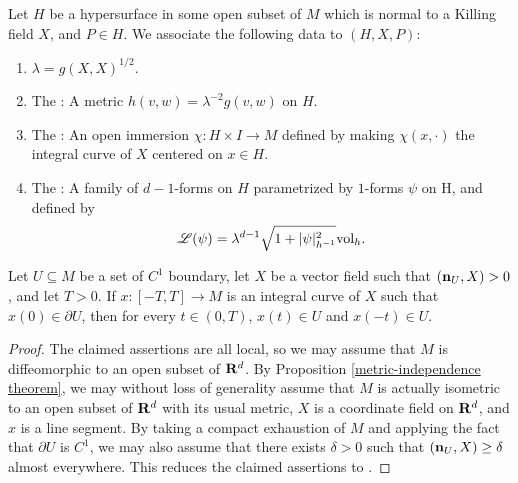 \begin{definition}\label{Killing setup}
Let $H$ be a hypersurface in some open subset of $M$ which is normal to a Killing field $X$, and $P \in H$.
We associate the following data to $(H, X, P)$:
\begin{enumerate}
\item $\lambda = g(X, X)^{1/2}$.
\item The : A metric $h(v, w) = \lambda^{-2} g(v, w)$ on $H$.
\item The : An open immersion $\chi: H \times I \to M$ defined by making $\chi(x, \cdot)$ the integral curve of $X$ centered on $x \in H$.
\item The : A family of $d-1$-forms on $H$ parametrized by $1$-forms $\psi$ on H, and defined by
\begin{equation}\label{area Lagrangian}
\mathscr L(\psi) = \lambda^{d - 1} \sqrt{1 + |\psi|_{h^{-1}}^2} \mathrm{vol}_h.
\end{equation}
\end{enumerate}
\end{definition}

\begin{lemma}\label{Giusti46}
Let $U \subseteq M$ be a set of $C^1$ boundary, let $X$ be a vector field such that $(\mathbf n_U, X) > 0$, and let $T > 0$.
If $x: [-T, T] \to M$ is an integral curve of $X$ such that $x(0) \in \partial U$, then for every $t \in (0, T)$, $x(t) \in U$ and $x(-t) \in U$.
\end{lemma}
\begin{proof}
The claimed assertions are all local, so we may assume that $M$ is diffeomorphic to an open subset of $\mathbf{R}^d$.
By Proposition \ref{metric-independence theorem}, we may without loss of generality assume that $M$ is actually isometric to an open subset of $\mathbf{R}^d$ with its usual metric, $X$ is a coordinate field on $\mathbf{R}^d$, and $x$ is a line segment.
By taking a compact exhaustion of $M$ and applying the fact that $\partial U$ is $C^1$, we may also assume that there exists $\delta > 0$ such that $(\mathbf n_U, X) \geq \delta$ almost everywhere.
This reduces the claimed assertions to \cite[Lemma 4.6, Remark 4.7]{Giusti77}.
\end{proof}

